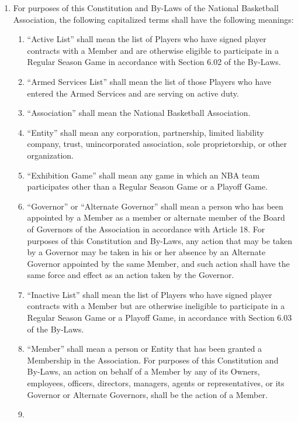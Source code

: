 \documentclass[]{book}
\providecommand{\tightlist}{%
  \setlength{\itemsep}{0pt}\setlength{\parskip}{0pt}}
\begin{document}
\begin{enumerate}
\def\labelenumi{(\alph{enumi})}
\tightlist
\item
  For purposes of this Constitution and By-Laws of the National Basketball Association, the following capitalized terms shall have the following meanings:

  \begin{enumerate}
  \def\labelenumii{(\arabic{enumii})}
  \tightlist
  \item
    ``Active List'' shall mean the list of Players who have signed player contracts with a Member and are otherwise eligible to participate in a Regular Season Game in accordance with Section 6.02 of the By-Laws.
  \item
    ``Armed Services List'' shall mean the list of those Players who have entered the Armed Services and are serving on active duty.
  \item
    ``Association'' shall mean the National Basketball Association.
  \item
    ``Entity'' shall mean any corporation, partnership, limited liability company, trust, unincorporated association, sole proprietorship, or other organization.
  \item
    ``Exhibition Game'' shall mean any game in which an NBA team participates other than a Regular Season Game or a Playoff Game.
  \item
    ``Governor'' or ``Alternate Governor'' shall mean a person who has been appointed by a Member as a member or alternate member of the Board of Governors of the Association in accordance with Article 18. For purposes of this Constitution and By-Laws, any action that may be taken by a Governor may be taken in his or her absence by an Alternate Governor appointed by the same Member, and such action shall have the same force and effect as an action taken by the Governor.
  \item
    ``Inactive List'' shall mean the list of Players who have signed player contracts with a Member but are otherwise ineligible to participate in a Regular Season Game or a Playoff Game, in accordance with Section 6.03 of the By-Laws.
  \item
    ``Member'' shall mean a person or Entity that has been granted a Membership in the Association. For purposes of this Constitution and By-Laws, an action on behalf of a Member by any of its Owners, employees, officers, directors, managers, agents or representatives, or its Governor or Alternate Governors, shall be the action of a Member.
  \item

\end{enumerate}
\end{enumerate}
\end{document}
